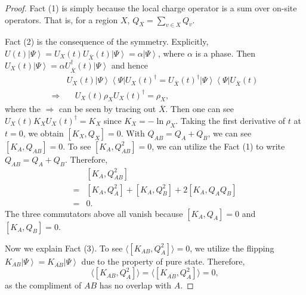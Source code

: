 \documentclass[10pt,a4paper]{amsart}
\def\bra#1{\left\langle#1\right|}
\def\ket#1{\left|#1\right\rangle}
\begin{document}
\begin{proof}
    Fact (1) is simply because the local charge operator is a sum over on-site operators. That is, for a region $X$, $Q_X = \sum_{v\in X} Q_v$. 

    Fact (2) is the consequence of the symmetry. Explicitly, $U(t)\ket{\Psi} = U_X(t)U_{\overline{X}}(t)\ket{\Psi} = \alpha \ket\Psi$, where $\alpha$ is a phase. Then $U_{X}(t)\ket{\Psi} = \alpha U_{\overline{X}}^{\dagger}(t)\ket{\Psi}$ and hence 
    \begin{equation}\label{eq:U-rho-commuting}\begin{split}
        &U_{X}(t)\ket{\Psi} \bra{\Psi}U_{X}(t)^{\dagger} = U_{\overline{X}}(t)^{\dagger}\ket{\Psi} \bra{\Psi}U_{\overline{X}}(t) \\ 
        \Rightarrow &\quad U_X(t)\rho_X U_X(t)^{\dagger} = \rho_X,
    \end{split}
    \end{equation}
    where the $\Rightarrow$ can be seen by tracing out $\overline{X}$. Then one can see $U_X(t)K_X U_X(t)^{\dagger} = K_X$ since $K_X = -\ln \rho_X$. Taking the first derivative of $t$ at $t=0$, we obtain $[K_X,Q_X]=0$. With $Q_{AB} = Q_{A}+Q_B$, we can see $[K_A,Q_{AB}]=0$. To see $[K_{A},Q_{AB}^2]= 0$, we can utilize the Fact (1) to write $Q_{AB} = Q_A + Q_B$. Therefore, 
    \begin{equation}\begin{split}
        & [K_{A},Q_{AB}^2]\\ 
        =& [K_{A},Q_{A}^2] +  [K_{A},Q_{B}^2] + 2  [K_{A},Q_{A}Q_B] \\ 
        =&0.
    \end{split}
    \end{equation}
    The three commutators above all vanish because $[K_A,Q_A]=0$ and $[K_A,Q_B]=0$.  
        
    Now we explain Fact (3). To see $\langle [K_{AB},Q_A^2]\rangle = 0$, we utilize the flipping $K_{AB}\ket\Psi = K_{\overline{AB}}\ket{\Psi}$ due to the property of pure state. Therefore, 
    \begin{equation}
        \langle [K_{AB},Q_A^2]\rangle = \langle [K_{\overline{AB}},Q_A^2]\rangle = 0,
    \end{equation}
    as the compliment of $AB$ has no overlap with $A$. 


\end{proof}
\end{document}
